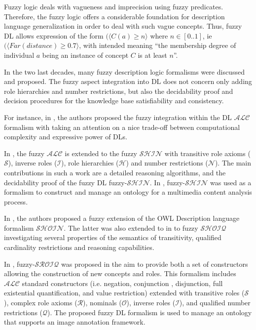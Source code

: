 		Fuzzy logic deals with vagueness and imprecision using fuzzy predicates. Therefore,
		the fuzzy logic offers a considerable foundation for description language generalization 
		in order to deal with such vague concepts. Thus, fuzzy DL allows expression of the form 
		$(\langle{}C(a) \geq n\rangle$ where $n \in [0..1]$, ie $(\langle{}Far(distance) \geq 0.7\rangle$, 
		with intended meaning “the membership degree of individual $a$ being an instance of concept $C$ 
		is at least $n$”. 

		In the two last decades, many fuzzy description logic formalisms were discussed and proposed. 
		The fuzzy aspect integration into DL does not concern only adding role hierarchies and number 
		restrictions, but also the decidability proof and decision procedures for the knowledge 
		base satisfiability and consistency. 

		For instance, in \citep{Stracci1998}, the authors proposed the fuzzy integration within 
		the DL $\mathcal{ALC}$ formalism with taking an attention on a nice trade-off between 
		computational complexity and expressive power of DLs.

		In \citep{Stoilos2005a,Stoilos2007}, the fuzzy $\mathcal{ALC}$ is extended to the fuzzy 
		$\mathcal{SHIN}$ with transitive role axioms ($\mathcal{S}$), inverse roles  ($\mathcal{I}$),
		role hierarchies ($\mathcal{H}$) and number restrictions ($\mathcal{N}$). The main contributions 
		in such a work are a detailed reasoning algorithms, and the decidability proof of the fuzzy DL 
		fuzzy-$\mathcal{SHIN}$. In \citep{Simou2007,Simou2008}, fuzzy-$\mathcal{SHIN}$ was used as a 
		formalism to construct and manage an ontology for a multimedia content analysis process.

		In \citep{Straccia2006}, the authors proposed a fuzzy extension of the OWL Description language
		formalism $\mathcal{SHOIN}$. The latter was also extended to in \citep{Stoilos2006} to 
		fuzzy $\mathcal{SHOIQ}$ investigating several properties of the semantics of transitivity, 
		qualified cardinality restrictions and reasoning capabilities.

		In \citep{Bannour2014}, fuzzy-$\mathcal{SROIQ}$ was proposed in the aim to provide both a 
		set of constructors allowing the construction of new concepts and roles. This formalism
		includes $\mathcal{ALC}$ standard constructors (i.e. negation, conjunction , disjunction,
		full existential quantification, and value restriction) extended with transitive roles 
		($\mathcal{S}$), complex role axioms ($\mathcal{R}$), nominals ($\mathcal{O}$), inverse 
		roles ($\mathcal{I}$), and qualified number restrictions ($\mathcal{Q}$). The proposed 
		fuzzy DL formalism is used to manage an ontology that supports an image annotation framework.

